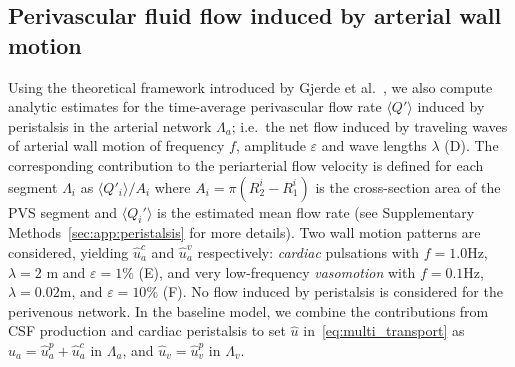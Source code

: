 \documentclass[fleqn,10pt]{wlscirep}
\begin{document}



\subsection*{Perivascular fluid flow induced by arterial wall motion}

Using the theoretical framework introduced by Gjerde et
al.~\cite{gjerde2023directional}, we also compute analytic estimates
for the time-average perivascular flow rate $\langle Q' \rangle$
induced by peristalsis in the arterial network $\Lambda_a$; i.e.~the
net flow induced by traveling waves of arterial wall motion of
frequency $f$, amplitude $\varepsilon$ and wave lengths $\lambda$
(D). The corresponding contribution to the periarterial
flow velocity is defined for each segment $\Lambda_i$ as $\langle Q'_i
\rangle/A_i$ where $A_i = \pi (R_2^i - R_1^i)$ is the cross-section
area of the PVS segment and $\langle Q_i' \rangle$ is the estimated
mean flow rate (see Supplementary Methods~\ref{sec:app:peristalsis}
for more details). Two wall motion patterns are considered, yielding
$\hat{u}_a^c$ and $\hat{u}_a^v$ respectively: \emph{cardiac}
pulsations with $f = 1.0$Hz, $\lambda = 2$ m and $\varepsilon = 1\%$
(E), and very low-frequency \emph{vasomotion} with $f =
0.1$Hz, $\lambda = 0.02$m, and $\varepsilon = 10\%$
(F). No flow induced by peristalsis is considered for
the perivenous network. In the baseline model, we combine the
contributions from CSF production and cardiac peristalsis to set
$\hat{u}$ in~\eqref{eq:multi_transport} as $\hat{u}_a = \hat{u}_a^p +
\hat{u}_a^c$ in $\Lambda_a$, and $\hat{u}_v = \hat{u}_v^p$ in
$\Lambda_v$.
\end{document}
